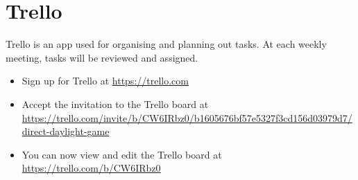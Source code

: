 \documentclass[11pt]{article}
\begin{document}
\section{Trello}
Trello is an app used for organising and planning out tasks. At each weekly meeting, tasks will be reviewed and assigned.
\begin{itemize}
\item Sign up for Trello at \url{https://trello.com}
\item Accept the invitation to the Trello board at \\ \url{https://trello.com/invite/b/CW6IRbz0/b1605676bf57e5327f3cd156d03979d7/direct-daylight-game}
\item You can now view and edit the Trello board at \url{https://trello.com/b/CW6IRbz0}
\end{itemize}
\end{document}
